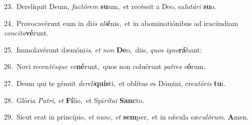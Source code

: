 {\numbfont\textcolor{\numbcolor}{23.}}~Derelíquit Deum, \textit{fac}\-\textit{tó}\textit{rem} \textbf{su}\-um,~\star et recéssit a Deo, sa\-\textit{lu}\-\textit{tá}\textit{ri} \textbf{su}\-o.\par
{\numbfont\textcolor{\numbcolor}{24.}}~Provocavérunt eum in di\textit{is} \textit{a}\-\textit{li}\textbf{é}nis,~\star et in abominatiónibus ad iracúndiam \textit{con}\-\textit{ci}\textit{ta}\textbf{vé}runt.\par
{\numbfont\textcolor{\numbcolor}{25.}}~Immolavérunt dæmóni\-\textit{is}\-, \textit{et} \textit{non} \textbf{De}\-o,~\star diis, \textit{quos} \textit{i}\-\textit{gno}\textbf{rá}bant:\par
{\numbfont\textcolor{\numbcolor}{26.}}~Novi recen\-\textit{tés}\-\textit{que} \textit{ve}\-\textbf{né}runt,~\star quos non coluérunt \textit{pa}\-\textit{tres} \textit{e}\-\textbf{ó}rum.\par
{\numbfont\textcolor{\numbcolor}{27.}}~Deum qui te génuit \textit{de}\-\textit{re}\textit{li}\textbf{quís}ti,~\star et oblítus es Dómini, cre\-\textit{a}\-\textit{tó}\textit{ris} \textbf{tu}\-i.\par
{\numbfont\textcolor{\numbcolor}{28.}}~Glória \textit{Pa}\-\textit{tri}, \textit{et} \textbf{Fí}\-lio,~\star et Spi\-\textit{rí}\-\textit{tu}\textit{i} \textbf{Sanc}\-to.\par
{\numbfont\textcolor{\numbcolor}{29.}}~Sicut erat in princípio, \textit{et} \textit{nunc}\-, \textit{et} \textbf{sem}\-per,~\star et in sǽcula sæ\-\textit{cu}\-\textit{ló}\textit{rum}. \textbf{A}\-men.\par
